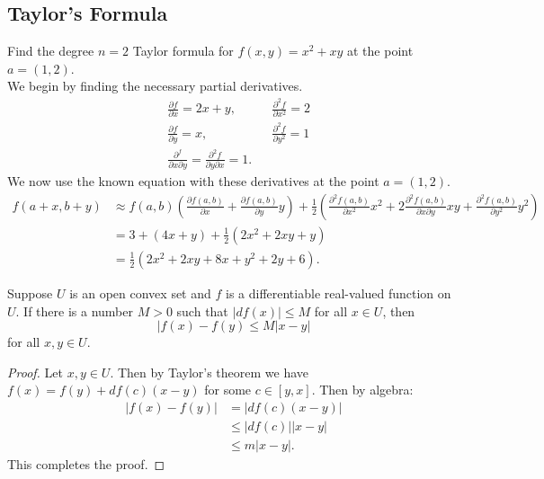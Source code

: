 \documentclass[12pt]{book}
\newenvironment{exercise}[2][Exercise]{\begin{trivlist}
\item[\hskip \labelsep {\bfseries #1}\hskip \labelsep {\bfseries #2.}]}{\end{trivlist}}
\begin{document}
\begin{exercise}{7.2.7}
\section{Taylor's Formula}


\begin{exercise}{9.5.1}
    Find the degree $n =2$ Taylor formula for $f(x,y)=x^2 + x y$ at the point $a=(1,2)$.  \\

    We begin by finding the necessary partial derivatives.
    \begin{align*}
        &\frac{\partial f}{\partial x} = 2x+y, &&\frac{\partial^2 f}{\partial x^2} = 2 \\
        &\frac{\partial f}{\partial y} = x,    &&\frac{\partial^2 f}{\partial y^2} = 1 \\
        &\frac{\partial^f}{\partial x \partial y} = \frac{\partial^2 f}{\partial y \partial x} = 1.
    \end{align*}
    We now use the known equation with these derivatives at the point $a=(1,2)$.
    \begin{align*}
        f(a+x, b+y) &\approx f(a,b) \left( \frac{\partial f(a,b)}{\partial x} + \frac{\partial f(a,b)}{\partial y} y \right) + \frac{1}{2} \left( \frac{\partial^2 f(a,b)}{\partial x^2} x^2 + 2 \frac{\partial^2 f(a,b)}{\partial x \partial y} x y + \frac{\partial^2 f(a,b)}{\partial y^2} y^2 \right)  \\
                    &= 3 + \left(4x+y\right) + \frac{1}{2} \left( 2 x^2 + 2 xy + y \right)  \\
                    &= \frac{1}{2} \left( 2x^2 + 2xy+ 8x+y^2 + 2 y + 6\right).
    \end{align*}
\end{exercise}

\begin{exercise}{9.5.4}
    Suppose $U$ is an open convex set and $f$ is a differentiable real-valued function on $U$. If there is a number $M > 0$ such that $|df(x)| \leq M$ for all $x\in U$, then
        \[ |f(x) - f(y) \leq M |x-y| \]
    for all $x,y \in U$.

    \begin{proof}
        Let $x,y \in U$. Then by Taylor's theorem we have $f(x) = f(y) + df(c) (x-y)$ for some $c \in [y,x]$. Then by algebra:
        \begin{align*}
            |f(x) - f(y) | &= |df(c)(x-y)| \\
                           &\leq |df(c)| |x-y| \\
                           &\leq m | x-y|.
        \end{align*}
        This completes the proof.
    \end{proof}
\end{exercise}



\end{exercise}
\end{document}
